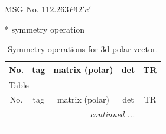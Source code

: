\documentclass[fleqn,8pt]{jsarticle}
\begin{document}
\setcounter{MaxMatrixCols}{32}

\renewcommand{\tablename}{Table~}
\renewcommand{\figurename}{Figure~}
\begin{center}
\LARGE
MSG No. 112.263\quad$P\bar{4}2'c'$
\end{center}
* symmetry operation
\renewcommand{\arraystretch}{1.3}
\begin{longtable}{ccccc}
\caption{Symmetry operations for 3d polar vector.}
 \\
 \hline \hline
No. & tag & matrix (polar) & det & TR \\ \hline \endfirsthead

\multicolumn{4}{l}{\tablename\ \thetable{}} \\
 \hline \hline
No. & tag & matrix (polar) & det & TR \\ \hline \endhead

 \hline \hline
\multicolumn{4}{r}{\footnotesize\it continued ...} \\ \endfoot

 \hline \hline
\multicolumn{4}{r}{} \\ \endlastfoot


\end{longtable}
\end{document}
